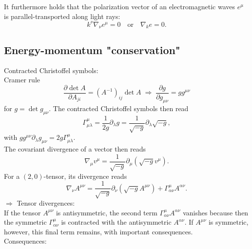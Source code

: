 It furthermore holds that the polarization vector of an electromagnetic waves $e^{\mu}$ is parallel-transported along light rays:
\begin{equation}
	k^{\nu} \nabla_{\nu} e^{\mu} =0 \quad \mathrm{or} \quad \nabla_{k} e = 0.
\end{equation}







\subsection{Energy-momentum "conservation"}

Contracted Christoffel symbols:\\
Cramer rule 
\begin{equation}
	\frac{\partial \det{A}}{\partial A_{ji}} =  (A^{-1})_{ij} \det{A} \; \Rightarrow \; \frac{\partial g}{\partial g_{\mu \nu}} = g g^{\mu \nu}
\end{equation}
for $g = \det{g_{\mu \nu}}$. The contracted Christoffel symbols then read
\begin{equation}
	\Gamma^{\mu}_{\mu \lambda} = \frac{1}{2 g} \partial_{\lambda} g = \frac{1}{\sqrt{-g} } \partial_{\lambda} \sqrt{-g},
\end{equation}
with $g g^{\mu \nu} \partial_{\lambda} g_{\mu \nu} = 2 g \Gamma^{\mu}_{\mu \lambda}$.\\
The covariant divergence of a vector then reads
\begin{equation}
	\nabla_{\mu} v^{\mu} = \frac{1}{\sqrt{-g}} \partial_{\mu} \left(\sqrt{-g} v^{\mu} \right).
\end{equation}
For a $(2,0)$-tensor, its divergence reads
\begin{equation}
	\nabla_{\nu} A^{\mu \nu} = \frac{1}{\sqrt{-g}} \partial_{\nu} \left(\sqrt{-g} A^{\mu \nu}\right) + \Gamma^{\mu}_{\alpha \nu} A^{\alpha \nu}.
\end{equation}
$\Rightarrow$ Tensor divergences:\\
If the tensor $A^{\mu \nu}$ is antisymmetric, the second term $\Gamma^{\mu}_{\alpha \nu} A^{\alpha \nu}$ vanishes because then the symmetric $\Gamma^{\mu}_{\alpha \nu}$ is contracted with the antisymmetric $A^{\alpha \nu}$. If $A^{\mu \nu}$ is symmetric, however, this final term remains, with important consequences.\\
Consequences:
